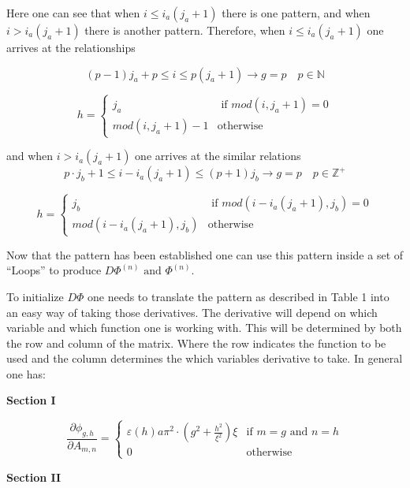\documentclass{article}
\newcommand{\pderiv}[2]{\frac{\partial #1}{\partial #2}} %
\newcommand{\spbox}[1]{ \text{ #1 }} %
\newcommand{\cfunc}[5]{
    #1 = 
    \begin{cases} 
        #2 & #3 \\
        #4 & #5
    \end{cases}
}
\begin{document}
Here one can see that when $i\le i_{a} \left(j_{a} +1\right)$ there is one
pattern, and when $i>i_{a} \left(j_{a} +1\right)$ there is another pattern.
Therefore, when $i\le i_{a} \left(j_{a} +1\right)$ one arrives at the
relationships 

\begin{equation*}
    \left(p - 1\right) j_{a} + p \le i \le p(j_{a} + 1) \to g = p 
    \quad p \in \mathbb{N} 
\end{equation*}

\begin{equation*}
    \cfunc{h}
    {j_{a}}{\spbox{if} mod(i,j_{a} + 1) = 0} 
    {mod(i,j_{a} +1) - 1}{\text{otherwise}} 
\end{equation*}

and when $i>i_{a} \left(j_{a} +1\right)$ one arrives at the similar relations
\begin{equation*}
    p \cdot j_{b} + 1 \le i - i_{a} \left(j_{a} + 1\right) \le \left(p + 1\right) j_{b} \to g = p
    \quad p \in \mathbb{Z}^{+}
\end{equation*}

\begin{equation*}
    \cfunc{h}
    {j_{b}}{\spbox{if} mod(i - i_{a} \left(j_{a} + 1\right), j_{b})=0}
    {mod(i - i_{a} \left(j_{a} + 1\right), j_{b})}{\text{otherwise}}
\end{equation*}

Now that the pattern has been established one can use this pattern inside a set
of ``Loops'' to produce $D\Phi ^{\left(n\right)} \spbox{and} \Phi ^{\left(n\right)}
$.

To initialize $D\Phi $ one needs to translate the pattern as described in Table
1 into an easy way of taking those derivatives. The derivative will depend on
which variable and which function one is working with. This will be determined
by both the row and column of the matrix. Where the row indicates the function
to be used and the column determines the which variables derivative to take. In
general one has:

\textbf{Section I}

\begin{equation} \label{4.10)} 
    \cfunc{\pderiv{\phi_{g,h}}{A_{m,n}}}
    {\varepsilon \left(h\right)a\pi ^{2} \cdot 
    \left(g^{2} +\frac{h^{2} }{\xi ^{2} } \right) \xi }{ \text{if } m = g \spbox{and} n = h } 
    {0}{\text{otherwise}}
\end{equation}

\textbf{Section II}
\end{document}
